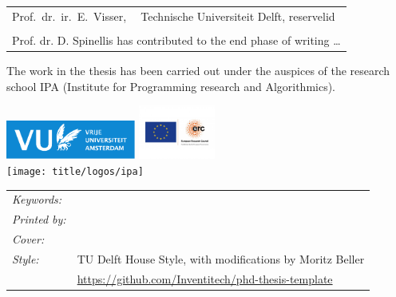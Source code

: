 \begin{titlepage}
\begin{tabular}{p{4.5cm}l}
    Prof.\ dr.\ ir.\ E.\ Visser, & Technische Universiteit Delft, reservelid \\ \\

    \multicolumn{2}{l}{Prof. dr. D. Spinellis has contributed to the end
    phase of writing \ldots} \\
\end{tabular}


\medskip
\medskip
\noindent The work in the thesis has been carried out under the auspices of the research school IPA
(Institute for Programming research and Algorithmics).

\medskip
\vfill
\begin{center}
    \includegraphics[height=0.5in]{title/logos/vulogo}
    \hspace{2em}
    \includegraphics[height=0.7in]{title/logos/erclogo}
    \\ \vspace{0.5cm}
    \texttt{[image: title/logos/ipa]}
\end{center}
\vfill

\noindent
\begin{tabular}{@{}p{}@{}p{}}
  \textit{Keywords:} &  \\[\medskipamount]
      \textit{Printed by:} &  \\[\medskipamount]
      \textit{Cover:} &  \\[\medskipamount]
      \textit{Style:} & TU Delft House Style, with modifications by Moritz Beller \\& \url{https://github.com/Inventitech/phd-thesis-template} \\[\medskipamount]
\end{tabular}


\end{titlepage}
